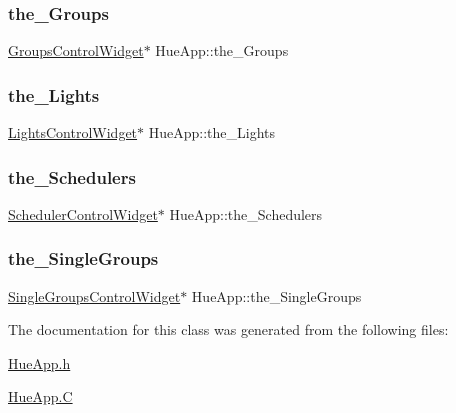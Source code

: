 \mbox{\label{class_hue_app_ae8a1698036628944f71e6bb985de7335}} 
\subsubsection{\texorpdfstring{the\+\_\+\+Groups}{the\_Groups}}
{\footnotesize\ttfamily \hyperlink{class_groups_control_widget}{Groups\+Control\+Widget}$\ast$ Hue\+App\+::the\+\_\+\+Groups\hspace{0.3cm}{\ttfamily [private]}}

\mbox{\label{class_hue_app_af56dcc0d22552d50417533c087816599}} 
\subsubsection{\texorpdfstring{the\+\_\+\+Lights}{the\_Lights}}
{\footnotesize\ttfamily \hyperlink{class_lights_control_widget}{Lights\+Control\+Widget}$\ast$ Hue\+App\+::the\+\_\+\+Lights\hspace{0.3cm}{\ttfamily [private]}}

\mbox{\label{class_hue_app_ae31f2868c0c0123f27ca4d60f7d63c0b}} 
\subsubsection{\texorpdfstring{the\+\_\+\+Schedulers}{the\_Schedulers}}
{\footnotesize\ttfamily \hyperlink{class_scheduler_control_widget}{Scheduler\+Control\+Widget}$\ast$ Hue\+App\+::the\+\_\+\+Schedulers\hspace{0.3cm}{\ttfamily [private]}}

\mbox{\label{class_hue_app_aa13e55cb1398a69aa97a8848d0981637}} 
\subsubsection{\texorpdfstring{the\+\_\+\+Single\+Groups}{the\_SingleGroups}}
{\footnotesize\ttfamily \hyperlink{class_single_groups_control_widget}{Single\+Groups\+Control\+Widget}$\ast$ Hue\+App\+::the\+\_\+\+Single\+Groups\hspace{0.3cm}{\ttfamily [private]}}



The documentation for this class was generated from the following files\+:\begin{DoxyCompactItemize}
\item 
\hyperlink{_hue_app_8h}{Hue\+App.\+h}\item 
\hyperlink{_hue_app_8_c}{Hue\+App.\+C}\end{DoxyCompactItemize}
